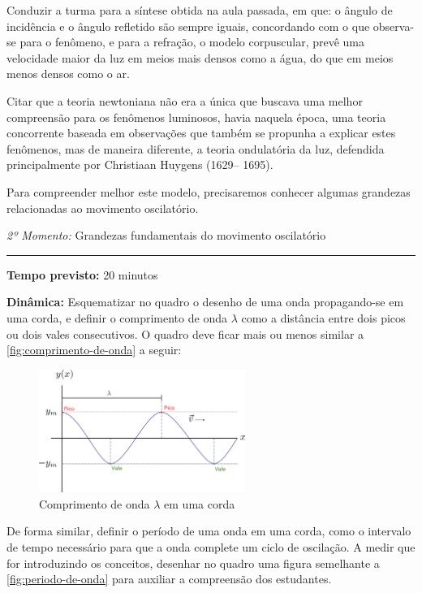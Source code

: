     Conduzir a turma para a  síntese obtida na aula passada, em que: o ângulo de incidência e o ângulo refletido são sempre iguais, concordando com o que observa-se para o fenômeno, e para a refração, o modelo corpuscular, prevê uma velocidade maior da luz em meios mais densos como a água, do que em meios menos densos como o ar.

    Citar que a teoria newtoniana não era a única que buscava uma melhor compreensão para os fenômenos luminosos, havia naquela época, uma teoria concorrente baseada em observações que também se propunha a explicar estes fenômenos, mas de maneira diferente, a teoria ondulatória da luz, defendida principalmente por Christiaan Huygens (1629– 1695). 

    Para compreender melhor este modelo, precisaremos conhecer algumas grandezas relacionadas ao movimento oscilatório.

    \vspace*{20pt}
    \noindent \emph{2º Momento:} Grandezas fundamentais do movimento oscilatório
    \par\noindent\rule{.3\textwidth}{.5pt}  
    \par\noindent \textbf{Tempo previsto:} 20 minutos

    \noindent \textbf{Dinâmica:} Esquematizar no quadro o desenho de uma onda propagando-se em uma corda, e definir o comprimento de onda $\lambda$ como a distância entre dois picos ou dois vales consecutivos. O quadro deve ficar mais ou menos similar a \autoref{fig:comprimento-de-onda} a seguir:
    \vspace*{20pt}
    \begin{figure}[!ht]
        \centering
        \includegraphics[width=0.6\textwidth]{img/lambda-1.png}
        \caption{Comprimento de onda $\lambda$ em uma corda}
        \label{fig:comprimento-de-onda}
    \end{figure}
    \vspace*{20pt}

    De forma similar, definir o período de uma onda em uma corda, como o intervalo de tempo necessário para que a onda complete um ciclo de oscilação. A medir que for introduzindo os conceitos, desenhar no quadro uma figura semelhante a \autoref{fig:periodo-de-onda} para auxiliar a compreensão dos estudantes.

